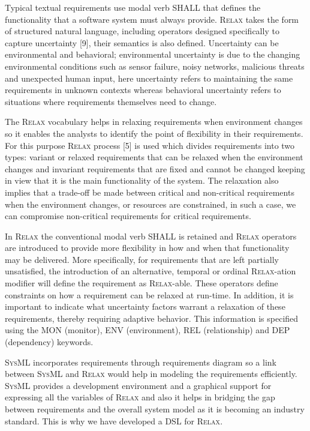 \documentclass[10pt, conference, compsocconf]{IEEEtran}
\def\myrelax{\textsc{Relax}}                  %
\def\sysml{\textsc{SysML}}
\begin{document}
Typical textual requirements use modal verb SHALL that defines the functionality that a software system must always provide. \myrelax{} takes the form of structured natural language, including operators designed specifically to capture uncertainty [9], their semantics is also defined. Uncertainty can be environmental and behavioral; environmental uncertainty is due to the changing environmental conditions such as sensor failure, noisy networks, malicious threats and unexpected human input, here uncertainty refers to maintaining the same requirements in unknown contexts whereas behavioral uncertainty refers to situations where requirements themselves need to change.

The \myrelax{} vocabulary helps in relaxing requirements when environment changes so it enables the analysts to identify the point of flexibility in their requirements. For this purpose \myrelax{} process [5] is used which divides requirements into two types: variant or relaxed requirements that can be relaxed when the environment changes and invariant requirements that are fixed and cannot be changed keeping in view that it is the main functionality of the system. The relaxation also implies that a trade-off be made between critical and non-critical requirements when the environment changes, or resources are constrained, in such a case, we can compromise non-critical requirements for critical requirements. 

In \myrelax{} the conventional modal verb SHALL is retained and \myrelax{} operators are introduced to provide more flexibility in how and when that functionality may be delivered. More specifically, for requirements that are left partially unsatisfied, the introduction of an alternative, temporal or ordinal \myrelax{}-ation modifier will define the requirement as \myrelax{}-able. These operators define constraints on how a requirement can be relaxed at run-time. In addition, it is important to indicate what uncertainty factors warrant a relaxation of these requirements, thereby requiring adaptive behavior. This information is specified using the MON (monitor), ENV (environment), REL (relationship) and DEP (dependency) keywords.

\sysml{} incorporates requirements through requirements diagram so a link between \sysml{} and \myrelax{} would help in modeling the requirements efficiently. \sysml{} provides a development environment and a graphical support for expressing all the variables of \myrelax{} and also it helps in bridging the gap between requirements and the overall system model as it is becoming an industry standard. This is why we have developed a DSL for \myrelax{}.
\end{document}
